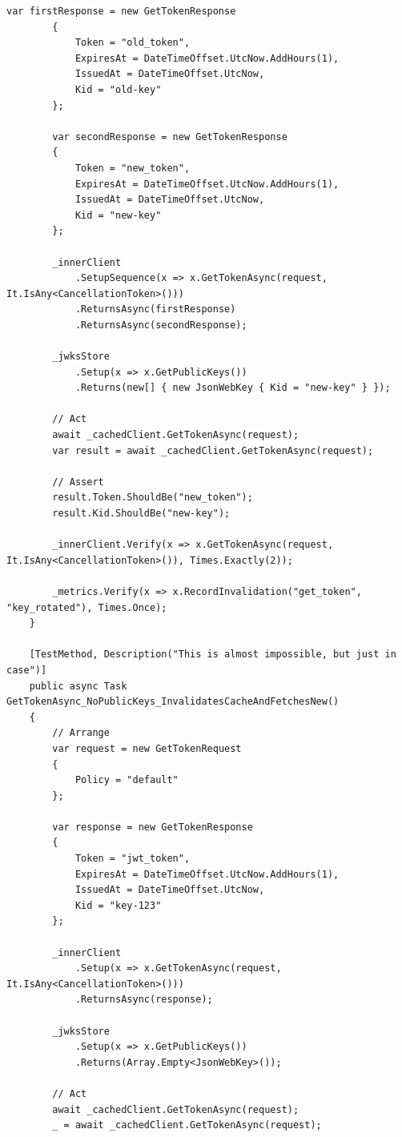 \begin{lstlisting}[language={[Sharp]C},
  label={lst:app-cached-client-tests},
  caption={Класс CachedAuthJwtClientTests: набор юнит-тестов для кеширующего клиента}]
        var firstResponse = new GetTokenResponse
        {
            Token = "old_token",
            ExpiresAt = DateTimeOffset.UtcNow.AddHours(1),
            IssuedAt = DateTimeOffset.UtcNow,
            Kid = "old-key"
        };

        var secondResponse = new GetTokenResponse
        {
            Token = "new_token",
            ExpiresAt = DateTimeOffset.UtcNow.AddHours(1),
            IssuedAt = DateTimeOffset.UtcNow,
            Kid = "new-key"
        };

        _innerClient
            .SetupSequence(x => x.GetTokenAsync(request, It.IsAny<CancellationToken>()))
            .ReturnsAsync(firstResponse)
            .ReturnsAsync(secondResponse);

        _jwksStore
            .Setup(x => x.GetPublicKeys())
            .Returns(new[] { new JsonWebKey { Kid = "new-key" } });

        // Act
        await _cachedClient.GetTokenAsync(request);
        var result = await _cachedClient.GetTokenAsync(request);

        // Assert
        result.Token.ShouldBe("new_token");
        result.Kid.ShouldBe("new-key");

        _innerClient.Verify(x => x.GetTokenAsync(request, It.IsAny<CancellationToken>()), Times.Exactly(2));

        _metrics.Verify(x => x.RecordInvalidation("get_token", "key_rotated"), Times.Once);
    }

    [TestMethod, Description("This is almost impossible, but just in case")]
    public async Task GetTokenAsync_NoPublicKeys_InvalidatesCacheAndFetchesNew()
    {
        // Arrange
        var request = new GetTokenRequest
        {
            Policy = "default"
        };

        var response = new GetTokenResponse
        {
            Token = "jwt_token",
            ExpiresAt = DateTimeOffset.UtcNow.AddHours(1),
            IssuedAt = DateTimeOffset.UtcNow,
            Kid = "key-123"
        };

        _innerClient
            .Setup(x => x.GetTokenAsync(request, It.IsAny<CancellationToken>()))
            .ReturnsAsync(response);

        _jwksStore
            .Setup(x => x.GetPublicKeys())
            .Returns(Array.Empty<JsonWebKey>());

        // Act
        await _cachedClient.GetTokenAsync(request);
        _ = await _cachedClient.GetTokenAsync(request);


\end{lstlisting}
